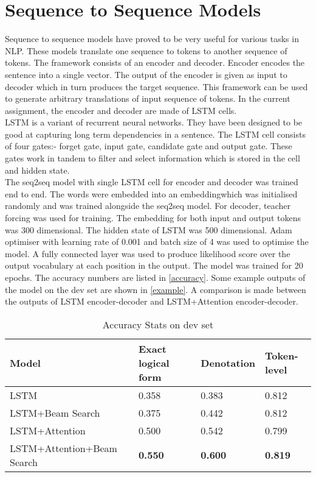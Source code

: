 \documentclass[11pt,a4paper]{article}
\begin{document}
\section{Sequence to Sequence Models}
Sequence to sequence models have proved to be very useful for various tasks in NLP. These models translate one sequence to tokens to another sequence of tokens. The framework consists of an encoder and decoder. Encoder encodes the sentence into a single vector. The output of the encoder is given as input to decoder which in turn produces the target sequence. This framework can be used to generate arbitrary translations of input sequence of tokens. In the current assignment, the encoder and decoder are made of LSTM cells. \\
LSTM is a variant of recurrent neural networks. They have been designed to be good at capturing long term dependencies in a sentence. The LSTM cell consists of four gates:- forget gate, input gate, candidate gate and output gate. These gates work in tandem to filter and select information which is stored in the cell and hidden state.\\
The seq2seq model with single LSTM cell for encoder and decoder was trained end to end. The words were embedded into an embeddingwhich was initialised randomly and was trained alongside the seq2seq model. For decoder, teacher forcing was used for training. The embedding for both input and output tokens was 300 dimensional. The hidden state of LSTM was 500 dimensional. Adam optimiser with learning rate of 0.001 and batch size of 4 was used to optimise the model. A fully connected layer was used to produce likelihood score over the output vocabulary at each position in the output. The model was trained for 20 epochs.  The accuracy numbers are listed in \autoref{accuracy}. Some example outputs of the model on the dev set are shown in \autoref{example}. A comparison is made between the outputs of LSTM encoder-decoder and LSTM+Attention encoder-decoder.
\begin{table*}[t!]
\begin{center}
\begin{tabular}{|l|l|l|l|}
\hline \textbf{Model} & \textbf{Exact logical form} & \textbf{Denotation} & \textbf{Token-level} \\ 
\hline
LSTM  & 0.358 & 0.383 & 0.812\\
LSTM+Beam Search & 0.375 & 0.442 & 0.812  \\
LSTM+Attention & 0.500 & 0.542 & 0.799\\
LSTM+Attention+Beam Search & \textbf{0.550} & \textbf{0.600} & \textbf{0.819} \\
\hline
\end{tabular}
\end{center}
\caption{\label{accuracy} Accuracy Stats on dev set}
\end{table*}
\end{document}
